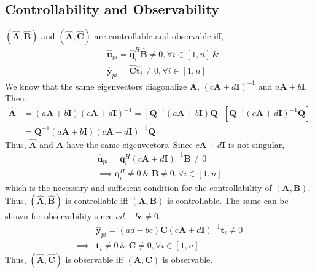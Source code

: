 \subsection{Controllability and Observability}
$(\hat{\mathbf{A}},\hat{\mathbf{B}})$ and $(\hat{\mathbf{A}},\hat{\mathbf{C}})$ are controllable and observable iff,
\begin{align*}
    &\hat{\bm{u}}_{pi} = \hat{\bm{q}}_i^H\hat{\bm{B}} \neq 0, \forall i \in [1,n] \: \&\\
    &\hat{\bm{y}}_{pi} = \hat{\bm{C}}\hat{\bm{t}}_i \neq 0, \forall i \in [1,n]
\end{align*}
We know that the same eigenvectors diagonalize $\bm{A}$, $(c\bm{A} + d\bm{I})^{-1}$ and $a\bm{A} + b\bm{I}$.
Then,
\begin{align*}
    \hat{\bm{A}} &= (a\bm{A} + b\bm{I})(c\bm{A} + d\bm{I})^{-1} = \left[\bm{Q}^{-1}(a\bm{A} + b\bm{I})\bm{Q}\right]\left[\bm{Q}^{-1}(c\bm{A} + d\bm{I})^{-1}\bm{Q}\right]\\
    &= \bm{Q}^{-1}(a\bm{A} + b\bm{I})(c\bm{A} + d\bm{I})^{-1}\bm{Q}
\end{align*}
Thus, $\hat{\bm{A}}$ and $\bm{A}$ have the same eigenvectors. Since $c\mathbf{A} + d\mathbf{I}$ is not singular,
\begin{align*}
    \hat{\bm{u}}_{pi} = \bm{q}_i^H(c\bm{A} + d\bm{I})^{-1}\bm{B} \neq 0\\
    \implies \bm{q}_i^H \neq 0 \: \& \: \bm{B} \neq 0, \forall i \in [1,n]
\end{align*}
which is the necessary and sufficient condition for the controllability of $(\mathbf{A},\mathbf{B})$. Thus, $(\hat{\mathbf{A}},\hat{\mathbf{B}})$ is controllable iff $(\mathbf{A},\mathbf{B})$ is controllable. The same can be shown for observability since $ad -bc \neq 0$,
\begin{align*}
    &\hat{\bm{y}}_{pi} = (ad-bc)\bm{C}\left(c\bm{A} + d\bm{I}\right)^{-1}\bm{t}_i \neq 0\\
    \implies &\bm{t}_i \neq 0 \: \& \: \bm{C} \neq 0, \forall i \in [1,n]
\end{align*}
Thus, $(\hat{\mathbf{A}},\hat{\mathbf{C}})$ is observable iff $(\mathbf{A},\mathbf{C})$ is observable.